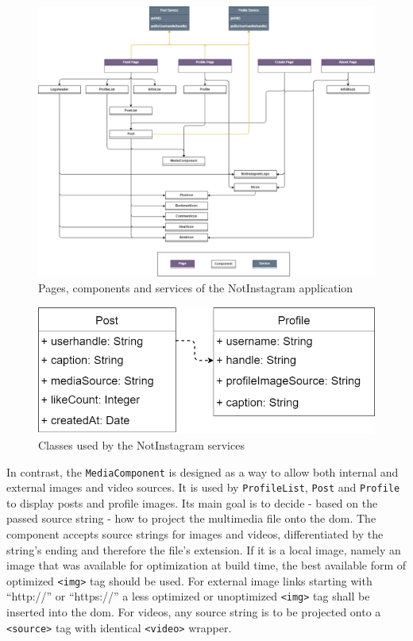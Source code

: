 \documentclass[a4paper, 12pt]{article}
\begin{document}
\begin{figure}
  \includegraphics[width=\linewidth]{diagrams/uml.png}
  \caption{Pages, components and services of the NotInstagram application}\label{fig:uml}
\end{figure}
\begin{figure}
  \begin{center}
    \includegraphics[width=0.5\linewidth]{diagrams/entities.png}
  \end{center}
  \caption{Classes used by the NotInstagram services}\label{fig:classes}
\end{figure}

In contrast, the \verb|MediaComponent| is designed as a way to allow both internal and external images and video sources.
It is used by \verb|ProfileList|, \verb|Post| and \verb|Profile| to display posts and profile images.
Its main goal is to decide - based on the passed source string - how to project the multimedia file onto the \acrshort{dom}.
The component accepts source strings for images and videos, differentiated by the string's ending and therefore the file's extension.
If it is a local image, namely an image that was available for optimization at build time, the best available form of optimized \verb|<img>| tag should be used.
For external image links starting with \enquote{http://} or \enquote{https://} a less optimized or unoptimized \verb|<img>| tag shall be inserted into the \acrshort{dom}.
For videos, any source string is to be projected onto a \verb|<source>| tag with identical \verb|<video>| wrapper.
\end{document}
